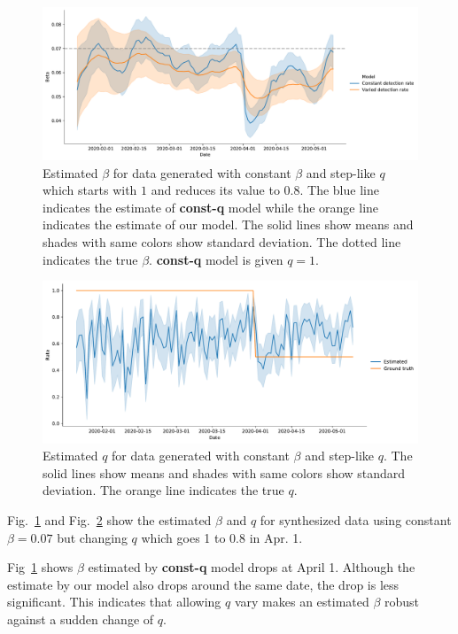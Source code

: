 \documentclass{amsart}
\begin{document}
\begin{figure}[h]
 \centering
 \includegraphics[width=\linewidth]{fig/step_beta.pdf}
 \caption{Estimated $\beta$ for data generated with constant $\beta$ and step-like $q$ which starts with $1$ and reduces its value to $0.8$. The blue line indicates the estimate of \textbf{const-q} model while the orange line indicates the estimate of our model. The solid lines show means and shades with same colors show standard deviation. The dotted line indicates the true $\beta$. \textbf{const-q} model is given $q=1$.}
 \label{fig:step-b}
\end{figure}

\begin{figure}[h]
 \centering
 \includegraphics[width=\linewidth]{fig/step_q.pdf}
 \caption{Estimated $q$ for data generated with constant $\beta$ and step-like $q$. The solid lines show means and shades with same colors show standard deviation. The orange line indicates the true $q$.}
 \label{fig:step-q}
\end{figure}

Fig.~\ref{fig:step-b} and Fig.~\ref{fig:step-q} show the estimated $\beta$ and $q$ for synthesized data using constant $\beta=0.07$ but changing $q$ which goes 1 to 0.8 in Apr. 1.

Fig~\ref{fig:step-b} shows $\beta$ estimated by \textbf{const-q} model drops at April 1.
Although the estimate by our model also drops around the same date, the drop is less significant.
This indicates that allowing $q$ vary makes an estimated $\beta$ robust against a sudden change of $q$.
\end{document}
